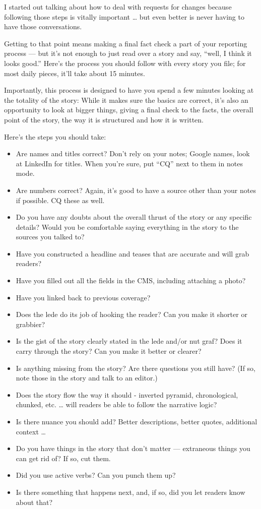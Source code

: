 \documentclass[
  11pt,
  american,
  letterpaperpaper,
  extrafontsizes,onecolumn,openright
  ]{memoir}
\providecommand{\tightlist}{%
  \setlength{\itemsep}{0pt}\setlength{\parskip}{0pt}}
\begin{document}
I started out talking about how to deal with requests for changes because following those steps is vitally important \ldots{} but even better is never having to have those conversations.

Getting to that point means making a final fact check a part of your reporting process --- but it's not enough to just read over a story and say, \enquote{well, I think it looks good.} Here's the process you should follow with every story you file; for most daily pieces, it'll take about 15 minutes.

Importantly, this process is designed to have you spend a few minutes looking at the totality of the story: While it makes sure the basics are correct, it's also an opportunity to look at bigger things, giving a final check to the facts, the overall point of the story, the way it is structured and how it is written.

Here's the steps you should take:

\begin{itemize}
\tightlist
\item
  Are names and titles correct? Don't rely on your notes; Google names, look at LinkedIn for titles. When you're sure, put \enquote{CQ} next to them in notes mode.
\item
  Are numbers correct? Again, it's good to have a source other than your notes if possible. CQ these as well.
\item
  Do you have any doubts about the overall thrust of the story or any specific details? Would you be comfortable saying everything in the story to the sources you talked to?
\item
  Have you constructed a headline and teases that are accurate and will grab readers?
\item
  Have you filled out all the fields in the CMS, including attaching a photo?
\item
  Have you linked back to previous coverage?
\item
  Does the lede do its job of hooking the reader? Can you make it shorter or grabbier?
\item
  Is the gist of the story clearly stated in the lede and/or nut graf? Does it carry through the story? Can you make it better or clearer?
\item
  Is anything missing from the story? Are there questions you still have? (If so, note those in the story and talk to an editor.)
\item
  Does the story flow the way it should - inverted pyramid, chronological, chunked, etc. \ldots{} will readers be able to follow the narrative logic?
\item
  Is there nuance you should add? Better descriptions, better quotes, additional context \ldots{}
\item
  Do you have things in the story that don't matter --- extraneous things you can get rid of? If so, cut them.
\item
  Did you use active verbs? Can you punch them up?
\item
  Is there something that happens next, and, if so, did you let readers know about that?
\end{itemize}
\end{document}
